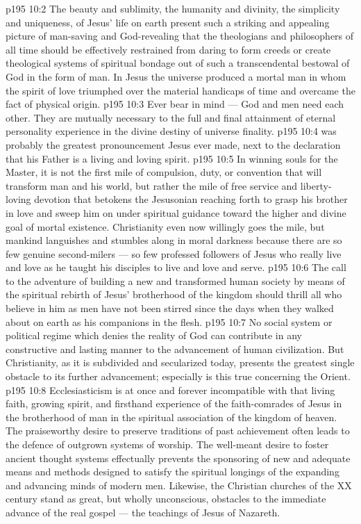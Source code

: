 \vs p195 10:2 The beauty and sublimity, the humanity and divinity, the simplicity and uniqueness, of Jesus’ life on earth present such a striking and appealing picture of man\hyp{}saving and God\hyp{}revealing that the theologians and philosophers of all time should be effectively restrained from daring to form creeds or create theological systems of spiritual bondage out of such a transcendental bestowal of God in the form of man. In Jesus the universe produced a mortal man in whom the spirit of love triumphed over the material handicaps of time and overcame the fact of physical origin.
\vs p195 10:3 \pc Ever bear in mind --- God and men need each other. They are mutually necessary to the full and final attainment of eternal personality experience in the divine destiny of universe finality.
\vs p195 10:4  was probably the greatest pronouncement Jesus ever made, next to the declaration that his Father is a living and loving spirit.
\vs p195 10:5 \pc In winning souls for the Master, it is not the first mile of compulsion, duty, or convention that will transform man and his world, but rather the  mile of free service and liberty\hyp{}loving devotion that betokens the Jesusonian reaching forth to grasp his brother in love and sweep him on under spiritual guidance toward the higher and divine goal of mortal existence. Christianity even now willingly goes the  mile, but mankind languishes and stumbles along in moral darkness because there are so few genuine second\hyp{}milers --- so few professed followers of Jesus who really live and love as he taught his disciples to live and love and serve.
\vs p195 10:6 The call to the adventure of building a new and transformed human society by means of the spiritual rebirth of Jesus’ brotherhood of the kingdom should thrill all who believe in him as men have not been stirred since the days when they walked about on earth as his companions in the flesh.
\vs p195 10:7 No social system or political regime which denies the reality of God can contribute in any constructive and lasting manner to the advancement of human civilization. But Christianity, as it is subdivided and secularized today, presents the greatest single obstacle to its further advancement; especially is this true concerning the Orient.
\vs p195 10:8 \pc Ecclesiasticism is at once and forever incompatible with that living faith, growing spirit, and firsthand experience of the faith\hyp{}comrades of Jesus in the brotherhood of man in the spiritual association of the kingdom of heaven. The praiseworthy desire to preserve traditions of past achievement often leads to the defence of outgrown systems of worship. The well\hyp{}meant desire to foster ancient thought systems effectually prevents the sponsoring of new and adequate means and methods designed to satisfy the spiritual longings of the expanding and advancing minds of modern men. Likewise, the Christian churches of the XX century stand as great, but wholly unconscious, obstacles to the immediate advance of the real gospel --- the teachings of Jesus of Nazareth.
